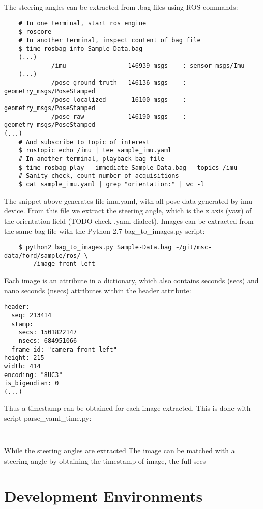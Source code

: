 The steering angles can be extracted from .bag files using ROS commands:
\begin{verbatim}
    # In one terminal, start ros engine
    $ roscore
    # In another terminal, inspect content of bag file
    $ time rosbag info Sample-Data.bag
    (...)
             /imu                 146939 msgs    : sensor_msgs/Imu             
    (...)
             /pose_ground_truth   146136 msgs    : geometry_msgs/PoseStamped   
             /pose_localized       16100 msgs    : geometry_msgs/PoseStamped   
             /pose_raw            146190 msgs    : geometry_msgs/PoseStamped   
(...)
    # And subscribe to topic of interest 
    $ rostopic echo /imu | tee sample_imu.yaml
    # In another terminal, playback bag file
    $ time rosbag play --immediate Sample-Data.bag --topics /imu
    # Sanity check, count number of acquisitions
    $ cat sample_imu.yaml | grep "orientation:" | wc -l
\end{verbatim}
The snippet above generates file imu.yaml, with all pose data generated by imu device. From this file we extract the steering angle, which is the z axis (yaw) of the orientation field (TODO check .yaml dialect). 
Images can be extracted from the same bag file with the Python 2.7 bag\_to\_images.py script:
\begin{verbatim}
    $ python2 bag_to_images.py Sample-Data.bag ~/git/msc-data/ford/sample/ros/ \
        /image_front_left
\end{verbatim}
Each image is an attribute in a dictionary, which also contains seconds (secs) and nano seconds (nsecs) attributes within the header attribute:
\begin{verbatim}
header: 
  seq: 213414
  stamp: 
    secs: 1501822147
    nsecs: 684951066
  frame_id: "camera_front_left"
height: 215
width: 414
encoding: "8UC3"
is_bigendian: 0
(...)
\end{verbatim}
Thus a timestamp can be obtained for each image extracted. This is done with script parse\_yaml\_time.py:
\begin{verbatim}
    
\end{verbatim}
While the steering angles are extracted 
The image can be matched with a steering angle by obtaining the timestamp of image, the full secs 


\section{Development Environments}

